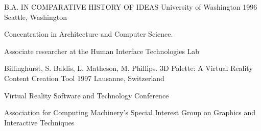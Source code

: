 \vspace{-7mm}
\begin{cventries}
    \cventry
    {B.A. IN COMPARATIVE HISTORY OF IDEAS}
    {University of Washington }
    {1996}
    {Seattle, Washington}
    {
    \begin{cvitems} %
        \item Concentration in Architecture and Computer Science.
        \item Associate researcher at the Human Interface Technologies Lab
    \end{cvitems}
    }
    \cventry
    {Billinghurst, S. Baldis, L. Matheson, M. Phillips.} 
    {3D Palette: A Virtual Reality Content Creation Tool}
    {1997} 
    {Lausanne, Switzerland}
    {
    \begin{cvitems}
        \item Virtual Reality Software and Technology Conference
        \item Association for Computing Machinery’s Special Interest Group on Graphics and Interactive Techniques 
    \end{cvitems}
    }
\end{cventries}
